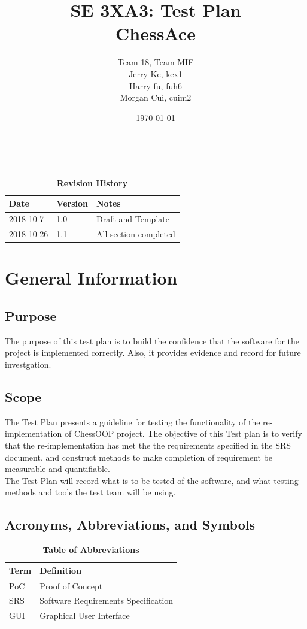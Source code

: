 \documentclass[12pt, titlepage]{article}
\title{SE 3XA3: Test Plan\\ ChessAce}
\author{Team 18, Team MIF
		\\ Jerry Ke, kex1
		\\ Harry fu, fuh6
		\\ Morgan Cui, cuim2
}
\date{\today}
\begin{document}
\maketitle ~\cite{SRS}

\tableofcontents
\listoftables
\listoffigures

\begin{table}[bp]
\begin{tabularx}{\textwidth}{p{3cm}p{2cm}X}
\toprule {\bf Date} & {\bf Version} & {\bf Notes}\\
\midrule
2018-10-7 & 1.0 & Draft and Template\\
2018-10-26& 1.1 & All section completed\\
\bottomrule
\end{tabularx}
\caption{\bf Revision History}
\end{table}

\newpage


\section{General Information}

\subsection{Purpose}
The purpose of this test plan is to build the confidence that the software for the project is implemented correctly. Also, it provides evidence and record for future investgation.

\subsection{Scope}
The Test Plan presents a guideline for testing the functionality of the re-implementation of ChessOOP project. The objective of this Test plan is to verify that the re-implementation has met the the requirements specified in the SRS document, and construct methods to make completion of requirement be measurable and quantifiable. \\
The Test Plan will record what is to be tested of the software, and what testing methods and tools the test team will be using.


\subsection{Acronyms, Abbreviations, and Symbols}
\begin{table}[!htbp]
	\centering
	\begin{tabular}[pos]{|l|l|}
		
		\hline
		\textbf{Term}& \textbf{Definition} \\ \hline
		PoC & Proof of Concept \\ \hline
		SRS & Software Requirements Specification \\ \hline
		GUI & Graphical User Interface \\ \hline
	\end{tabular}
		\caption{\bf Table of Abbreviations}
	\label{table1}
	\end{table}
\end{document}
